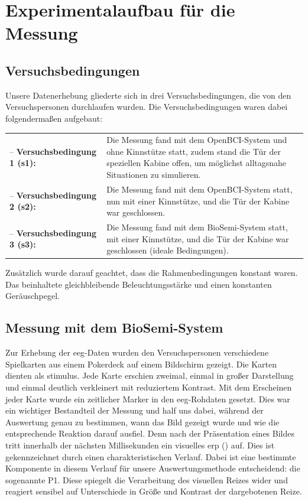 \section{Experimentalaufbau für die Messung} 
\subsection{Versuchsbedingungen}
\label{sec:bedingungen}
Unsere Datenerhebung gliederte sich in drei Versuchsbedingungen, die von den Versuchspersonen durchlaufen wurden. Die Versuchsbedingungen waren dabei folgendermaßen aufgebaut: \\
\begin{tabularx}{\textwidth}{@{}lX@{}}
-- \textbf{Versuchsbedingung 1 (s1):} & Die Messung fand mit dem OpenBCI-System und ohne Kinnstütze statt, zudem stand die Tür der speziellen Kabine offen, um möglichst alltagsnahe Situationen zu simulieren.  \\
-- \textbf{Versuchsbedingung 2 (s2):} & Die Messung fand mit dem OpenBCI-System statt, nun mit einer Kinnstütze, und die Tür der Kabine war geschlossen. \\
-- \textbf{Versuchsbedingung 3 (s3):} & Die Messung fand mit dem BioSemi-System statt, mit einer Kinnstütze, und die Tür der Kabine war geschlossen (ideale Bedingungen). \\
\end{tabularx}
Zusätzlich wurde darauf geachtet, dass die Rahmenbedingungen konstant waren. Das beinhaltete gleichbleibende Beleuchtungsstärke und einen konstanten Geräuschpegel.

\subsection{Messung mit dem BioSemi-System}
\label{sec:messung_biosemi}
Zur Erhebung der \acrshort{eeg}-Daten wurden den Versuchspersonen verschiedene Spielkarten aus einem Pokerdeck auf einem Bildschirm gezeigt. Die Karten dienten als \gls{stimulus}. Jede Karte erschien zweimal, einmal in großer Darstellung und einmal deutlich verkleinert mit reduziertem Kontrast. Mit dem Erscheinen jeder Karte wurde ein zeitlicher Marker in den \acrshort{eeg}-Rohdaten gesetzt. Dies war ein wichtiger Bestandteil der Messung und half uns dabei, während der Auswertung genau zu bestimmen, wann das Bild gezeigt wurde und wie die entsprechende Reaktion darauf ausfiel. Denn nach der Präsentation eines Bildes tritt innerhalb der nächsten Millisekunden ein visuelles \acrshort{erp} () auf. Dies ist gekennzeichnet durch einen charakteristischen Verlauf. Dabei ist eine bestimmte Komponente in diesem Verlauf für unsere Auswertungsmethode entscheidend: die sogenannte P1. Diese spiegelt die Verarbeitung des visuellen Reizes wider und reagiert sensibel auf Unterschiede in Größe und Kontrast der dargebotenen Reize.

